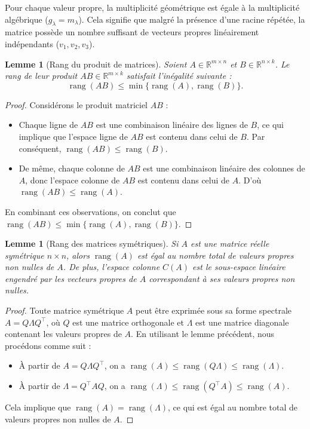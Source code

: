 \documentclass[12pt]{report}
\newtheorem{lemma}[theorem]{Lemme}
\begin{document}
\noindent Pour chaque valeur propre, la multiplicité géométrique est égale à la multiplicité algébrique ($g_\lambda = m_\lambda$). Cela signifie que malgré la présence d'une racine répétée, la matrice possède un nombre suffisant de vecteurs propres linéairement indépendants ($v_1, v_2, v_3$).

\begin{lemma}[Rang du produit de matrices]
    Soient $A \in \mathbb{R}^{m \times n}$ et $B \in \mathbb{R}^{n \times k}$. Le rang de leur produit $AB \in \mathbb{R}^{m \times k}$ satisfait l'inégalité suivante :
    \[
        \operatorname{rang}(AB) \leq \min\{\operatorname{rang}(A), \operatorname{rang}(B)\}.
    \]
\end{lemma}

\begin{proof}
    Considérons le produit matriciel $AB$ :
    \begin{itemize}
        \item Chaque ligne de $AB$ est une combinaison linéaire des lignes de $B$, ce qui implique que l'espace ligne de $AB$ est contenu dans celui de $B$. Par conséquent, $\operatorname{rang}(AB) \leq \operatorname{rang}(B)$.
        \item De même, chaque colonne de $AB$ est une combinaison linéaire des colonnes de $A$, donc l'espace colonne de $AB$ est contenu dans celui de $A$. D'où $\operatorname{rang}(AB) \leq \operatorname{rang}(A)$.
    \end{itemize}
    En combinant ces observations, on conclut que $\operatorname{rang}(AB) \leq \min\{\operatorname{rang}(A), \operatorname{rang}(B)\}$.
\end{proof}

\begin{lemma}[Rang des matrices symétriques]
    Si $A$ est une matrice réelle symétrique $n \times n$,  alors  $\operatorname{rang}(A)$ est égal au nombre total de valeurs propres non nulles de $A$. De plus, l'espace colonne $C(A)$ est le sous-espace linéaire engendré par les vecteurs propres de $A$ correspondant à ses valeurs propres non nulles.
\end{lemma}

\begin{proof}
    Toute matrice symétrique $A$ peut être exprimée sous sa forme spectrale $A = Q \Lambda Q^\top$, où $Q$ est une matrice orthogonale et $\Lambda$ est une matrice diagonale contenant les valeurs propres de $A$. En utilisant le lemme précédent, nous procédons comme suit :
    \begin{itemize}
        \item À partir de $A = Q \Lambda Q^\top$, on a $\operatorname{rang}(A) \leq \operatorname{rang}(Q \Lambda) \leq \operatorname{rang}(\Lambda)$.
        \item À partir de $\Lambda = Q^\top A Q$, on a $\operatorname{rang}(\Lambda) \leq \operatorname{rang}(Q^\top A) \leq \operatorname{rang}(A)$.
    \end{itemize}
    Cela implique que $\operatorname{rang}(A) = \operatorname{rang}(\Lambda)$, ce qui est égal au nombre total de valeurs propres non nulles de $A$.
\end{proof}
\end{document}
